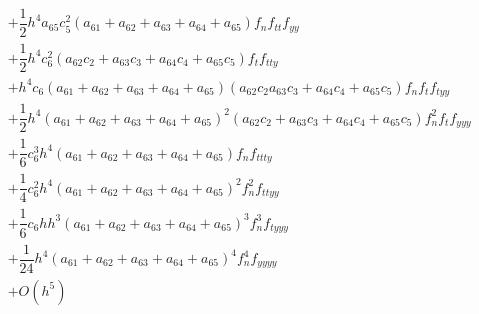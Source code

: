 \documentclass[a4paper,oneside]{book}
\numberwithin{equation}{chapter}
\begin{document}
\begin{align}
 &+ \dfrac{1}{2}{h^4}{a_{65}}c_5^2\left( {{a_{61}} + {a_{62}} + {a_{63}} + {a_{64}} + {a_{65}}} \right){f_n}{f_{tt}}{f_{yy}}\\
& + \dfrac{1}{2}{h^4}c_6^2\left( {{a_{62}}{c_2} + {a_{63}}{c_3} + {a_{64}}{c_4} + {a_{65}}{c_5}} \right){f_t}{f_{tty}}\\
& + {h^4}{c_6}\left( {{a_{61}} + {a_{62}} + {a_{63}} + {a_{64}} + {a_{65}}} \right)\left( {{a_{62}}{c_2}{a_{63}}{c_3} + {a_{64}}{c_4} + {a_{65}}{c_5}} \right){f_n}{f_t}{f_{tyy}}\\
& + \dfrac{1}{2}{h^4}{\left( {{a_{61}} + {a_{62}} + {a_{63}} + {a_{64}} + {a_{65}}} \right)^2}\left( {{a_{62}}{c_2} + {a_{63}}{c_3} + {a_{64}}{c_4} + {a_{65}}{c_5}} \right)f_n^2{f_t}{f_{yyy}}\\
& + \dfrac{1}{6}c_6^3{h^4}\left( {{a_{61}} + {a_{62}} + {a_{63}} + {a_{64}} + {a_{65}}} \right){f_n}{f_{ttty}}\\
& + \dfrac{1}{4}c_6^2{h^4}{\left( {{a_{61}} + {a_{62}} + {a_{63}} + {a_{64}} + {a_{65}}} \right)^2}f_n^2{f_{ttyy}}\\
& + \dfrac{1}{6}{c_6}h{h^3}{\left( {{a_{61}} + {a_{62}} + {a_{63}} + {a_{64}} + {a_{65}}} \right)^3}f_n^3{f_{tyyy}}\\
& + \dfrac{1}{{24}}{h^4}{\left( {{a_{61}} + {a_{62}} + {a_{63}} + {a_{64}} + {a_{65}}} \right)^4}f_n^4{f_{yyyy}}\\
& + O\left( {{h^5}} \right)
\end{align}
\end{document}
